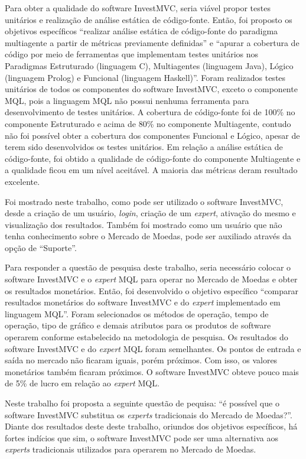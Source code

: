Para obter a qualidade do software InvestMVC, seria viável propor testes unitários e realização de análise estática de código-fonte. Então, foi proposto os objetivos específicos “realizar análise estática de código-fonte do paradigma multiagente a partir de métricas previamente definidas” e “apurar a cobertura de código por meio de ferramentas que implementam testes unitários nos Paradigmas Estruturado (linguagem C), Multiagentes (linguagem Java), Lógico (linguagem Prolog) e Funcional (linguagem Haskell)”. Foram realizados testes unitários de todos os componentes do software InvestMVC, exceto o componente MQL, pois a linguagem MQL não possui nenhuma ferramenta para desenvolvimento de testes unitários. A cobertura de código-fonte foi de 100\% no componente Estruturado e acima de 80\% no componente Multiagente, contudo não foi possível obter a cobertura dos componentes Funcional e Lógico, apesar de terem sido desenvolvidos os testes unitários. Em relação a análise estática de código-fonte, foi obtido a qualidade de código-fonte do componente Multiagente e a qualidade ficou em um nível aceitável. A maioria das métricas deram resultado excelente.

Foi mostrado neste trabalho, como pode ser utilizado o software InvestMVC, desde a criação de um usuário, \textit{login}, criação de um \textit{expert}, ativação do mesmo e visualização dos resultados. Também foi mostrado como um usuário que não tenha conhecimento sobre o Mercado de Moedas, pode ser auxiliado através da opção de “Suporte”. 

Para responder a questão de pesquisa deste trabalho, seria necessário colocar o software InvestMVC e o \textit{expert} MQL para operar no Mercado de Moedas e obter os resultados monetários. Então, foi desenvolvido o objetivo específico “comparar resultados monetários do software InvestMVC e do \textit{expert} implementado em linguagem MQL”. Foram selecionados os métodos de operação, tempo de operação, tipo de gráfico e demais atributos para os produtos de software operarem conforme estabelecido na metodologia de pesquisa. Os resultados do software InvestMVC e do \textit{expert} MQL foram semelhantes. Os pontos de entrada e saída no mercado não ficaram iguais, porém próximos. Com isso, os valores monetários também ficaram próximos. O software InvestMVC obteve pouco mais de 5\% de lucro em relação ao \textit{expert} MQL.

Neste trabalho foi proposta a seguinte questão de pequisa: “é possível que o software InvestMVC substitua os \textit{experts} tradicionais do Mercado de Moedas?”. Diante dos resultados deste deste trabalho, oriundos dos objetivos específicos, há fortes indícios que sim, o software InvestMVC pode ser uma alternativa aos \textit{experts} tradicionais utilizados para operarem no Mercado de Moedas.

